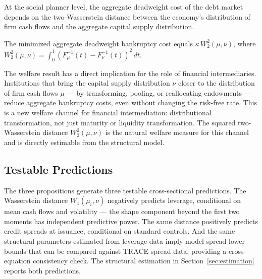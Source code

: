 At the social planner level, the aggregate deadweight cost of the debt market depends on the two-Wasserstein distance between the economy's distribution of firm cash flows and the aggregate capital supply distribution.

\begin{proposition}[Welfare]
\label{prop:welfare}
The minimized aggregate deadweight bankruptcy cost equals $\kappa\,W_2^2(\mu,\nu)$, where $W_2^2(\mu,\nu) = \int_0^1 (F_\mu^{-1}(t) - F_\nu^{-1}(t))^2\,dt$.
\end{proposition}

The welfare result has a direct implication for the role of financial intermediaries. Institutions that bring the capital supply distribution $\nu$ closer to the distribution of firm cash flows $\mu$ — by transforming, pooling, or reallocating endowments — reduce aggregate bankruptcy costs, even without changing the risk-free rate. This is a new welfare channel for financial intermediation: distributional transformation, not just maturity or liquidity transformation. The squared two-Wasserstein distance $W_2^2(\mu,\nu)$ is the natural welfare measure for this channel and is directly estimable from the structural model.

\subsection{Testable Predictions}

The three propositions generate three testable cross-sectional predictions. The Wasserstein distance $W_1(\mu_i, \nu)$ negatively predicts leverage, conditional on mean cash flows and volatility — the shape component beyond the first two moments has independent predictive power. The same distance positively predicts credit spreads at issuance, conditional on standard controls. And the same structural parameters estimated from leverage data imply model spread lower bounds that can be compared against TRACE spread data, providing a cross-equation consistency check. The structural estimation in Section~\ref{sec:estimation} reports both predictions.
